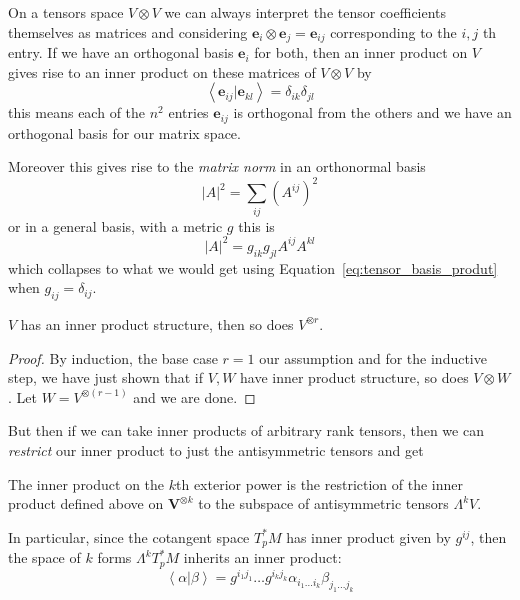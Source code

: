 \documentclass[../master.tex]{subfiles}
\begin{document}
	\begin{example}
		On a tensors space $V \otimes V$ we can always interpret the tensor coefficients themselves as matrices and considering $\mathbf e_i \otimes \mathbf e_j = \mathbf e_{ij}$ corresponding to the $i,j$ th entry. If we have an orthogonal basis $\mathbf e_i$ for both, then an inner product on $V$ gives rise to an inner product on these matrices of $V \otimes V$ by
		\begin{equation}\label{eq:tensor_basis_produt}
			\left< \mathbf e_{ij} | \mathbf e_{kl} \right> = \delta_{ik} \delta_{jl}
		\end{equation}
		this means each of the $n^2$ entries $\mathbf e_{ij}$ is orthogonal from the others and we have an orthogonal basis for our matrix space.
	\end{example}
	Moreover this gives rise to the \emph{matrix norm} in an orthonormal basis
	\begin{equation}
		|A|^2 = \sum_{ij} (A^{ij})^2
	\end{equation}
	or in a general basis, with a metric $g$ this is 
	\begin{equation}
		|A|^2 = g_{i k} g_{j l} A^{i j} A^{k l}
	\end{equation}
	which collapses to what we would get using Equation~\eqref{eq:tensor_basis_produt} when $g_{ij} = \delta_{ij}$. 
	\begin{prop}
		$V$ has an inner product structure, then so does $V^{\otimes r}$.
	\end{prop}
	\begin{proof}
		By induction, the base case $r=1$ our assumption and for the inductive step, we have just shown that if $V,W$ have inner product structure, so does $V \otimes W$. Let $W = V^{\otimes(r-1)}$ and we are done.
	\end{proof}
	
	But then if we can take inner products of arbitrary rank tensors, then we can \emph{restrict} our inner product to just the antisymmetric tensors and get

	\begin{defn}
		The inner product on the $k$th exterior power is the restriction of the inner product defined above on $\mathbf V^{\otimes k}$ to the subspace of antisymmetric tensors $\Lambda^k V$.
		
		In particular, since the cotangent space $T^*_pM$ has inner product given by $g^{ij}$, then the space of $k$ forms $\Lambda^k T^*_pM$ inherits an inner product:
		\begin{equation}
			\left< \alpha | \beta \right> = g^{i_1 j_1} \dots g^{i_k j_k} \alpha_{i_1\dots i_k} \beta_{j_1 \dots j_k}
		\end{equation}
	\end{defn}
	
\end{document}
